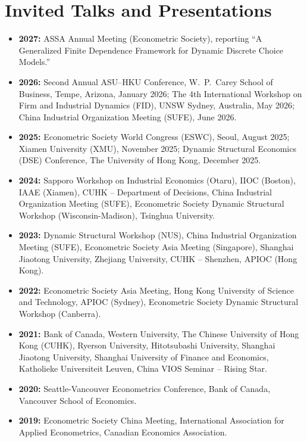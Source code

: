 \documentclass[11pt]{article}
\begin{document}
\section*{Invited Talks and Presentations}
\begin{itemize}[leftmargin=*,itemsep=0pt,parsep=0pt,topsep=1pt]
  \item \textcolor{muted}{\textbf{2027:}} ASSA Annual Meeting (Econometric Society), reporting ``A Generalized Finite Dependence Framework for Dynamic Discrete Choice Models.''
  \item \textcolor{muted}{\textbf{2026:}} Second Annual ASU--HKU Conference, W.\ P.\ Carey School of Business, Tempe, Arizona, January 2026; The 4th International Workshop on Firm and Industrial Dynamics (FID), UNSW Sydney, Australia, May 2026; China Industrial Organization Meeting (SUFE), June 2026.
  \item \textcolor{muted}{\textbf{2025:}} Econometric Society World Congress (ESWC), Seoul, August 2025; Xiamen University (XMU), November 2025; Dynamic Structural Economics (DSE) Conference, The University of Hong Kong, December 2025.
  \item \textcolor{muted}{\textbf{2024:}} Sapporo Workshop on Industrial Economics (Otaru), IIOC (Boston), IAAE (Xiamen), CUHK -- Department of Decisions, China Industrial Organization Meeting (SUFE), Econometric Society Dynamic Structural Workshop (Wisconsin-Madison), Tsinghua University.
  \item \textcolor{muted}{\textbf{2023:}} Dynamic Structural Workshop (NUS), China Industrial Organization Meeting (SUFE), Econometric Society Asia Meeting (Singapore), Shanghai Jiaotong University, Zhejiang University, CUHK -- Shenzhen, APIOC (Hong Kong).
  \item \textcolor{muted}{\textbf{2022:}} Econometric Society Asia Meeting, Hong Kong University of Science and Technology, APIOC (Sydney), Econometric Society Dynamic Structural Workshop (Canberra).
  \item \textcolor{muted}{\textbf{2021:}} Bank of Canada, Western University, The Chinese University of Hong Kong (CUHK), Ryerson University, Hitotsubashi University, Shanghai Jiaotong University, Shanghai University of Finance and Economics, Katholieke Universiteit Leuven, China VIOS Seminar -- Rising Star.
  \item \textcolor{muted}{\textbf{2020:}} Seattle-Vancouver Econometrics Conference, Bank of Canada, Vancouver School of Economics.
  \item \textcolor{muted}{\textbf{2019:}} Econometric Society China Meeting, International Association for Applied Econometrics, Canadian Economics Association.
\end{itemize}
\end{document}
